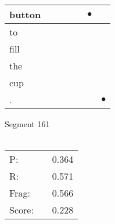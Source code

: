 \documentclass[landscape]{article}
\newcommand{\ssp}{\hspace{2pt}}
\newcommand{\mex}{\cellcolor{g}$\bullet$}
\begin{document}
\begin{tabular}{|l|p{10pt}|p{10pt}|p{10pt}|p{10pt}|p{10pt}|p{10pt}|}
\hline
\ssp \cellcolor{ref4}button \ssp&\hspace{2pt}&\hspace{2pt}&\hspace{2pt}&\hspace{2pt}&\hspace{2pt}\mex&\hspace{2pt}\\
\hline
\ssp to \ssp&\hspace{2pt}&\hspace{2pt}&\hspace{2pt}&\hspace{2pt}&\hspace{2pt}&\hspace{2pt}\\
\hline
\ssp fill \ssp&\hspace{2pt}&\hspace{2pt}&\hspace{2pt}&\hspace{2pt}&\hspace{2pt}&\hspace{2pt}\\
\hline
\ssp the \ssp&\hspace{2pt}&\hspace{2pt}&\hspace{2pt}&\hspace{2pt}&\hspace{2pt}&\hspace{2pt}\\
\hline
\ssp cup \ssp&\hspace{2pt}&\hspace{2pt}&\hspace{2pt}&\hspace{2pt}&\hspace{2pt}&\hspace{2pt}\\
\hline
\ssp \cellcolor{ref5}. \ssp&\hspace{2pt}&\hspace{2pt}&\hspace{2pt}&\hspace{2pt}&\hspace{2pt}&\hspace{2pt}\mex\\
\hline
\end{tabular}

\vspace{6pt}
\noindent Segment 161\\\\
\noindent\begin{tabular}{lm{12pt}r}
\hline
P:&&0.364\\
R:&&0.571\\
Frag:&&0.566\\
Score:&&0.228\\
\end{tabular}
\end{document}
